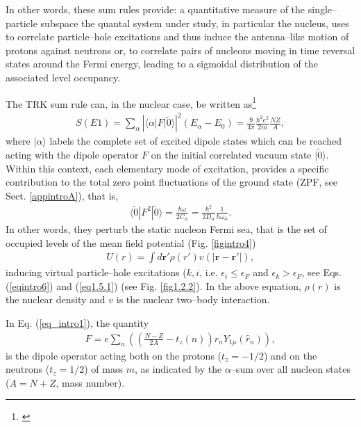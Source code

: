 In other words, these sum rules provide: a quantitative measure of the single--particle subspace the quantal system under study, in particular the nucleus, uses to correlate particle--hole excitations and thus induce the antenna--like motion of protons against neutrons or, to correlate pairs of nucleons moving in time reversal states around the Fermi energy, leading to a sigmoidal distribution of the associated level occupancy. 


The TRK sum rule can, in the nuclear case, be written as\footnote{\cite{Bohr:75,Bertsch:05,Bortignon:98}}
\begin{align}\label{eq_intro1}
S(E1)=\sum_\alpha\left|\langle\alpha|F|\tilde 0\rangle\right|^2(E_\alpha-E_0)=\frac{9}{4\pi}\frac{\hbar^2e^2}{2m}\frac{NZ}{A},
\end{align}
where $|\alpha\rangle$ labels the complete set of excited dipole states which can be reached acting with the dipole operator $F$ on the initial correlated vacuum state $|\tilde 0\rangle$. Within this context, each elementary mode of excitation, provides a specific contribution to the total zero point fluctuations of the ground state (ZPF, see Sect. \ref{appintroA}), that is,
\begin{align}\label{eqintro2}
\langle\tilde 0|F^2|\tilde 0\rangle=\frac{\hbar \omega}{2C_\alpha}=\frac{\hbar^2}{2D_\alpha}\frac{1}{\hbar\omega_\alpha}.
\end{align}
In other words, they perturb the static nucleon Fermi sea, that is the set of occupied levels of the mean field potential (Fig. \ref{figintro4})
\begin{align}\label{eqintro3}
U(r)=\int d\mathbf r' \rho(r')v(|\mathbf r-\mathbf r'|),
\end{align}
inducing virtual particle--hole excitations ($k,i$, i.e. $\epsilon_i\leq\epsilon_F$ and $\epsilon_k>\epsilon_F$, see Eqs. (\ref{eqintro6}) and (\ref{eq1.5.1}) (see Fig. \ref{fig1.2.2}). In the above equation, $\rho(r)$ is the nuclear density and $v$ is the nuclear two--body interaction.  


In Eq. (\ref{eq_intro1}), the quantity 
\begin{align}
F=e\sum_n\left(\left(\frac{N-Z}{2A}-t_z(n)\right)r_nY_{1\mu}(\hat r_n)\right),
\end{align}
is the dipole operator acting both on the  protons ($t_z=-1/2$) and on the neutrons ($t_z=1/2$) of mass $m$, as indicated by the $\alpha$--sum over all nucleon states ($A=N+Z$, mass number).

